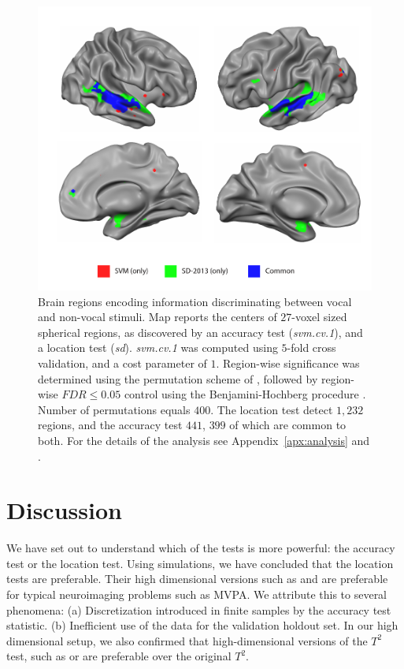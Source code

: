 \documentclass[12pt,a4paper]{article}
\begin{document}
\begin{figure}[th]
\centering
\includegraphics[width=0.7\linewidth]{"art/svm_vs_SD"}
\caption{\footnotesize
Brain regions encoding information discriminating between vocal and non-vocal stimuli.
Map reports the centers of $27$-voxel sized spherical regions, as discovered by an accuracy test (\emph{svm.cv.1}), and a location test (\emph{sd}). 
\emph{svm.cv.1} was computed using $5$-fold cross validation, and a cost parameter of $1$. 
Region-wise significance was determined using the permutation scheme of \cite{stelzer_statistical_2013}, followed by region-wise $FDR \leq 0.05$ control using the Benjamini-Hochberg procedure \citep{benjamini_controlling_1995}.
Number of permutations equals $400$.
The location test detect $1,232$ regions, and the accuracy test $441$, $399$ of which are common to both.
For the details of the analysis see Appendix~\ref{apx:analysis} and \cite{gilron_quantifying_2016}.  
  }
\label{fig:read_data}
\end{figure}








\section{Discussion}
\label{sec:discussion}

We have set out to understand which of the tests is more powerful: the accuracy test or the location test. 
Using simulations, we have concluded that the location tests are preferable. 
Their high dimensional versions such as \cite{srivastava_testing_2013} and \cite{schafer_shrinkage_2005} are preferable for typical neuroimaging problems such as MVPA.
We attribute this to several phenomena: 
(a) Discretization introduced in finite samples by the accuracy test statistic. 
(b) Inefficient use of the data for the validation holdout set. 
In our high dimensional setup, we also confirmed that high-dimensional versions of the $T^2$ test, such as \cite{srivastava_testing_2013} or \cite{schafer_shrinkage_2005} are preferable over the original $T^2$. 
\end{document}
